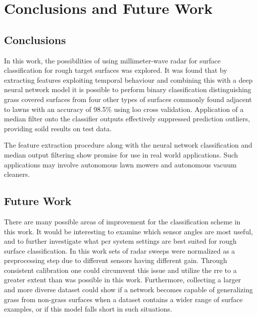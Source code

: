 \chapter{Conclusions and Future Work}

\section{Conclusions}

In this work, the possibilities of using millimeter-wave radar for surface classification for rough target surfaces was explored. It was found that by extracting features exploiting temporal behaviour and combining this with a deep neural network model it is possible to perform binary classification distinguishing grass covered surfaces from four other types of surfaces commonly found adjacent to lawns with an accuracy of 98.5\% using \gls{loo} cross validation. Application of a median filter onto the classifier outputs effectively suppressed prediction outliers, providing soild results on test data. 

The feature extraction procedure along with the neural network classification and median output filtering show promise for use in real world applications. Such applications may involve autonomous lawn mowers and autonomous vacuum cleaners. 



\section{Future Work}

There are many possible areas of improvement for the classification scheme in this work. It would be interesting to examine which sensor angles are most useful, and to further investigate what \gls{pcr} system settings are best suited for rough surface classification. In this work sets of radar sweeps were normalized as a preprocessing step due to different sensors having different gain. Through consistent calibration one could circumvent this issue and utilize the \gls{rre} to a greater extent than was possible in this work. Furthermore, collecting a larger and more diverse dataset could show if a network becomes capable of generalizing grass from non-grass surfaces when a dataset contains a wider range of surface examples, or if this model falls short in such situations. 


